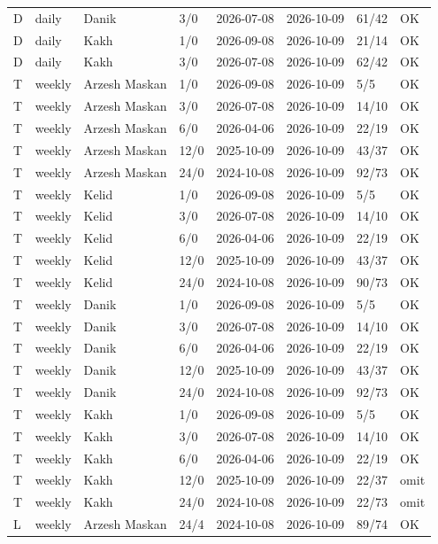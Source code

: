 \documentclass[11pt,a4paper]{article}
\begin{document}
\begin{longtable}{llllllll}
D & daily & Danik & 3/0 & 2026-07-08 & 2026-10-09 & 61/42 & OK \\
D & daily & Kakh & 1/0 & 2026-09-08 & 2026-10-09 & 21/14 & OK \\
D & daily & Kakh & 3/0 & 2026-07-08 & 2026-10-09 & 62/42 & OK \\
T & weekly & Arzesh Maskan & 1/0 & 2026-09-08 & 2026-10-09 & 5/5 & OK \\
T & weekly & Arzesh Maskan & 3/0 & 2026-07-08 & 2026-10-09 & 14/10 & OK \\
T & weekly & Arzesh Maskan & 6/0 & 2026-04-06 & 2026-10-09 & 22/19 & OK \\
T & weekly & Arzesh Maskan & 12/0 & 2025-10-09 & 2026-10-09 & 43/37 & OK \\
T & weekly & Arzesh Maskan & 24/0 & 2024-10-08 & 2026-10-09 & 92/73 & OK \\
T & weekly & Kelid & 1/0 & 2026-09-08 & 2026-10-09 & 5/5 & OK \\
T & weekly & Kelid & 3/0 & 2026-07-08 & 2026-10-09 & 14/10 & OK \\
T & weekly & Kelid & 6/0 & 2026-04-06 & 2026-10-09 & 22/19 & OK \\
T & weekly & Kelid & 12/0 & 2025-10-09 & 2026-10-09 & 43/37 & OK \\
T & weekly & Kelid & 24/0 & 2024-10-08 & 2026-10-09 & 90/73 & OK \\
T & weekly & Danik & 1/0 & 2026-09-08 & 2026-10-09 & 5/5 & OK \\
T & weekly & Danik & 3/0 & 2026-07-08 & 2026-10-09 & 14/10 & OK \\
T & weekly & Danik & 6/0 & 2026-04-06 & 2026-10-09 & 22/19 & OK \\
T & weekly & Danik & 12/0 & 2025-10-09 & 2026-10-09 & 43/37 & OK \\
T & weekly & Danik & 24/0 & 2024-10-08 & 2026-10-09 & 92/73 & OK \\
T & weekly & Kakh & 1/0 & 2026-09-08 & 2026-10-09 & 5/5 & OK \\
T & weekly & Kakh & 3/0 & 2026-07-08 & 2026-10-09 & 14/10 & OK \\
T & weekly & Kakh & 6/0 & 2026-04-06 & 2026-10-09 & 22/19 & OK \\
T & weekly & Kakh & 12/0 & 2025-10-09 & 2026-10-09 & 22/37 & omit \\
T & weekly & Kakh & 24/0 & 2024-10-08 & 2026-10-09 & 22/73 & omit \\
L & weekly & Arzesh Maskan & 24/4 & 2024-10-08 & 2026-10-09 & 89/74 & OK \\

\end{longtable}
\end{document}
